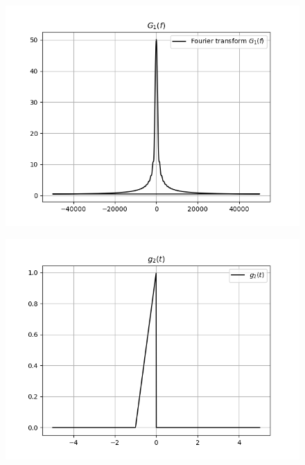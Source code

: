 \documentclass[journal,12pt,twocolumn]{IEEEtran}
\begin{document}
\begin{figure}[!ht]
\centering
 \includegraphics[width=\columnwidth]{graphs/fourier_g1.png}
\end{figure}

\begin{figure}[!ht]
\centering
 \includegraphics[width=\columnwidth]{graphs/g2.png}
\end{figure}
\end{document}
